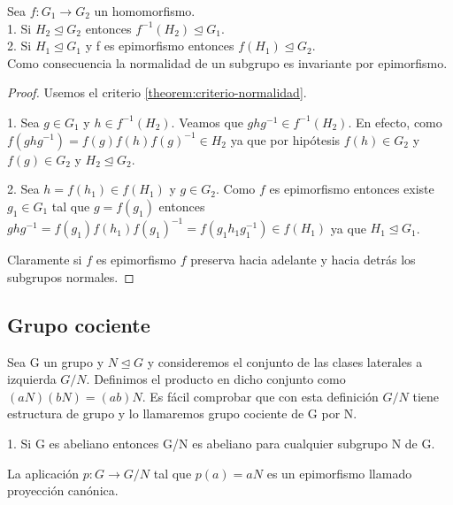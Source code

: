 \begin{nth}
Sea $f: G_1 \rightarrow G_2$ un homomorfismo.\\
1. Si $H_2 \trianglelefteq G_2$ entonces $f^{-1}(H_2) \trianglelefteq G_1$. \\
2. Si $H_1 \trianglelefteq G_1$ y f es epimorfismo entonces $f(H_1) \trianglelefteq G_2$. \\
Como consecuencia la normalidad de un subgrupo es invariante por epimorfismo.
\end{nth}
\begin{proof}
Usemos el criterio \ref{theorem:criterio-normalidad}. 

1. Sea $g \in G_1$ y $h \in f^{-1}(H_2)$. Veamos que $ghg^{-1} \in f^{-1}(H_2)$. En efecto, como $f(ghg^{-1}) = f(g)f(h)f(g)^{-1} \in H_2$ ya que por hipótesis $f(h) \in G_2$ y $f(g) \in G_2$ y $H_2 \trianglelefteq G_2$.

2. Sea $h=f(h_1) \in f(H_1)$ y $g \in G_2$. Como $f$ es epimorfismo entonces existe $g_1 \in G_1$ tal que $g = f(g_1)$ entonces $ghg^{-1} = f(g_1)f(h_1)f(g_1)^{-1} = f(g_1h_1g_1^{-1}) \in f(H_1)$ ya que $H_1 \trianglelefteq G_1$.

Claramente si $f$ es epimorfismo $f$ preserva hacia adelante y hacia detrás los subgrupos normales.
\end{proof}

\subsection{Grupo cociente}

\begin{ndef}
Sea G un grupo y $N \unlhd G$ y consideremos el conjunto de las clases laterales a izquierda $G/N$. Definimos el producto en dicho conjunto como $(aN)(bN) = (ab)N$. Es fácil comprobar que con esta definición $G/N$ tiene estructura de grupo y lo llamaremos grupo cociente de G por N.
\end{ndef}

\begin{ejemplo}
1. Si G es abeliano entonces G/N es abeliano para cualquier subgrupo N de G.
\end{ejemplo}

\begin{ndef}
La aplicación $p:G \rightarrow G/N$ tal que $p(a) = aN$ es un epimorfismo llamado proyección canónica.
\end{ndef}

